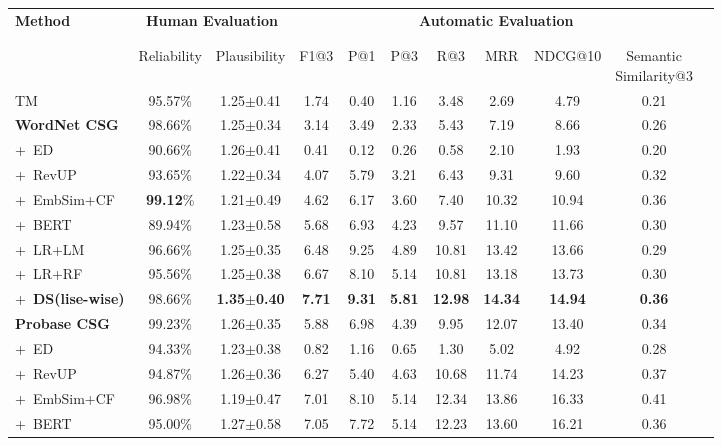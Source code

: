 \begin{table}[t!]
	\small
	\centering
		\begin{tabular}{lc cc c c c c c cc}
			\toprule
			\multirow{3}{*}{\textbf{Method}} &\multicolumn{2}{c|}{\textbf{Human Evaluation}} &\multicolumn{7}{c}{\textbf{Automatic Evaluation}} \\
			\\ [-1.8ex]
			\cline{2-10}
			\\ [-1.8ex]
			& Reliability & Plausibility  &F1@3 & P@1 & P@3 &R@3 & MRR & NDCG@10 & \tabincell{c}{Semantic \\ Similarity@3}\\
			\midrule
			TM &95.57\%  &1.25$\pm$0.41 &1.74 &0.40  &1.16  &3.48   &2.69  &4.79  &0.21 \\
			\midrule
			\textbf{WordNet CSG} &98.66\% &1.25$\pm$0.34 &3.14 &3.49 &2.33 &5.43 &7.19 &8.66 &0.26 \\
			+~ED &90.66\% &1.26$\pm$0.41  &0.41 &0.12  &0.26  &0.58  &2.10  &1.93  &0.20 \\
			+~RevUP &93.65\%  &1.22$\pm$0.34  &4.07 &5.79  &3.21  &6.43 &9.31  &9.60  &0.32 \\
			+~EmbSim+CF &\textbf{99.12}\%  &1.21$\pm$0.49  &4.62  &6.17  &3.60  &7.40  &10.32  &10.94  &0.36 \\
			+~BERT &89.94\% &1.23$\pm$0.58  &5.68 &6.93  &4.23  &9.57  &11.10  &11.66  &0.30 \\
			+~LR+LM &96.66\%  &1.25$\pm$0.35 &6.48 &9.25  &4.89 &10.81   &13.42 &13.66 &0.29\\
			+~LR+RF &95.56\%  &1.25$\pm$0.38 &6.67 &8.10 &5.14 &10.81   &13.18 &13.73 &0.30 \\
			+~\textbf{DS(lise-wise)} &98.66\%  &\textbf{1.35$\pm$0.40}   &\textbf{7.71} &\textbf{9.31} &\textbf{5.81} &\textbf{12.98} &\textbf{14.34} &\textbf{14.94} &\textbf{0.36} \\
			\midrule
			\textbf{Probase CSG} &99.23\% &1.26$\pm$0.35 &5.88 &6.98 &4.39 &9.95  &12.07 &13.40 &0.34 \\
			+~ED &94.33\%  &1.23$\pm$0.38  &0.82 &1.16  &0.65  &1.30  &5.02  &4.92  &0.28 \\
			+~RevUP &94.87\%  &1.26$\pm$0.36  &6.27 &5.40  &4.63  &10.68  &11.74  &14.23  &0.37 \\
			+~EmbSim+CF &96.98\%  &1.19$\pm$0.47  &7.01 &8.10  &5.14  &12.34  &13.86  &16.33  &0.41 \\
			+~BERT &95.00\% &1.27$\pm$0.58  &7.05 &7.72  &5.14  &12.23  &13.60  &16.21  &0.36 \\

\end{tabular}
\end{table}
